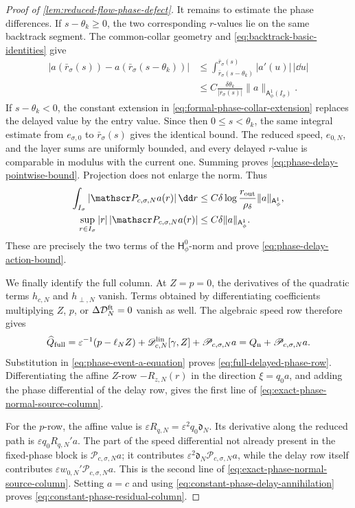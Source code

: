 \begin{proof}[Proof of \cref{lem:reduced-flow-phase-defect}]
It remains to estimate the phase differences.  If
\(s-\theta_k\ge0\), the two corresponding \(r\)-values lie on the same
backtrack segment.  The common-collar geometry and
\cref{eq:backtrack-basic-identities} give
\begin{align*}
 |a(\bar r_\sigma(s))-a(\bar r_\sigma(s-\theta_k))|
 &\le \int_{\bar r_\sigma(s-\theta_k)}^{\bar r_\sigma(s)}
                 |a'(u)|\,|\dd u|\\
 &\le C\frac{\delta\theta_k}{|\bar r_\sigma(s)|}
              \|a\|_{\mathsf A_\phi^1(I_\sigma)}.
\end{align*}
If \(s-\theta_k<0\), the constant extension in
\cref{eq:formal-phase-collar-extension} replaces the delayed value by the
entry value.  Since then \(0\le s<\theta_k\), the same integral estimate
from \(e_{\sigma,0}\) to \(\bar r_\sigma(s)\) gives the identical bound.
The reduced speed, \(e_{0,N}\), and the layer sums are uniformly bounded,
and every delayed \(r\)-value is comparable in modulus with the current
one.  Summing proves \cref{eq:phase-delay-pointwise-bound}.  Projection
does not enlarge the norm.  Thus
\begin{align*}
 \int_{I_\sigma}|\mathscr P_{c,\sigma,N}a(r)|\,\dd r
 &\le C\delta\log\frac{r_{\rm out}}{\rho_\delta}
              \|a\|_{\mathsf A_\phi^1},\\
 \sup_{r\in I_\sigma}|r|\,
       |\mathscr P_{c,\sigma,N}a(r)|
 &\le C\delta\|a\|_{\mathsf A_\phi^1}.
\end{align*}
These are precisely the two terms of the
\(\mathsf H_\phi^0\)-norm and prove
\cref{eq:phase-delay-action-bound}.

We finally identify the full column.  At \(Z=p=0\), the derivatives of
the quadratic terms \(h_{c,N}\) and \(h_{\perp,N}\) vanish.  Terms obtained
by differentiating coefficients multiplying \(Z\), \(p\), or
\(\Delta\mathcal D_N^{\rm ft}=0\) vanish as well.  The algebraic speed
row therefore gives
\[
 \widehat Q_{\rm full}
 =\varepsilon^{-1}(p-\ell_NZ)
   +\mathscr D_{c,N}^{\rm lin}[\gamma,Z]
   +\mathscr P_{c,\sigma,N}a
 =Q_{\rm n}+\mathscr P_{c,\sigma,N}a.
\]
Substitution in \cref{eq:phase-event-a-equation} proves
\cref{eq:full-delayed-phase-row}.  Differentiating the affine \(Z\)-row
\(-R_{z,N}(r)\) in the direction
\(\xi=q_0a\), and adding the phase differential of the delay row, gives
the first line of \cref{eq:exact-phase-normal-source-column}.

For the \(p\)-row, the affine value is
\(
 \varepsilon R_{q,N}=\varepsilon^2q_0\mathfrak d_N
\).
Its derivative along the reduced path is
\(\varepsilon q_0R_{q,N}'a\).  The part of the speed differential not
already present in the fixed-phase block is
\(\mathscr P_{c,\sigma,N}a\); it contributes
\(\varepsilon^2\mathfrak d_N\mathscr P_{c,\sigma,N}a\), while the delay
row itself contributes
\(\varepsilon w_{0,N}'\mathscr P_{c,\sigma,N}a\).  This is the second
line of \cref{eq:exact-phase-normal-source-column}.  Setting \(a=c\) and
using \cref{eq:constant-phase-delay-annihilation} proves
\cref{eq:constant-phase-residual-column}.


\end{proof}
